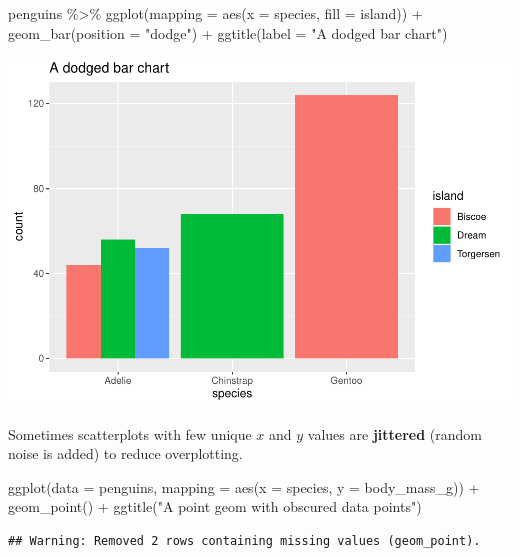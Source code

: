 \documentclass[
]{article}
\newenvironment{Shaded}{\begin{snugshade}}{\end{snugshade}}
\newcommand{\AttributeTok}[1]{\textcolor[rgb]{0.77,0.63,0.00}{#1}}
\newcommand{\FunctionTok}[1]{\textcolor[rgb]{0.00,0.00,0.00}{#1}}
\newcommand{\NormalTok}[1]{#1}
\newcommand{\SpecialCharTok}[1]{\textcolor[rgb]{0.00,0.00,0.00}{#1}}
\newcommand{\StringTok}[1]{\textcolor[rgb]{0.31,0.60,0.02}{#1}}
\begin{document}
\begin{Shaded}
\begin{Highlighting}[]
\NormalTok{penguins }\SpecialCharTok{\%\textgreater{}\%}
  \FunctionTok{ggplot}\NormalTok{(}\AttributeTok{mapping =} \FunctionTok{aes}\NormalTok{(}\AttributeTok{x =}\NormalTok{ species, }\AttributeTok{fill =}\NormalTok{ island)) }\SpecialCharTok{+}
  \FunctionTok{geom\_bar}\NormalTok{(}\AttributeTok{position =} \StringTok{"dodge"}\NormalTok{) }\SpecialCharTok{+}
  \FunctionTok{ggtitle}\NormalTok{(}\AttributeTok{label =} \StringTok{"A dodged bar chart"}\NormalTok{)}
\end{Highlighting}
\end{Shaded}

\includegraphics{Grammar-of-Graphics_files/figure-latex/unnamed-chunk-1-2.pdf}

Sometimes scatterplots with few unique \(x\) and \(y\) values are
\textbf{jittered} (random noise is added) to reduce overplotting.

\begin{Shaded}
\begin{Highlighting}[]
\FunctionTok{ggplot}\NormalTok{(}\AttributeTok{data =}\NormalTok{ penguins, }\AttributeTok{mapping =} \FunctionTok{aes}\NormalTok{(}\AttributeTok{x =}\NormalTok{ species, }\AttributeTok{y =}\NormalTok{ body\_mass\_g)) }\SpecialCharTok{+}
  \FunctionTok{geom\_point}\NormalTok{() }\SpecialCharTok{+}
  \FunctionTok{ggtitle}\NormalTok{(}\StringTok{"A point geom with obscured data points"}\NormalTok{)}
\end{Highlighting}
\end{Shaded}

\begin{verbatim}
## Warning: Removed 2 rows containing missing values (geom_point).
\end{verbatim}
\end{document}
